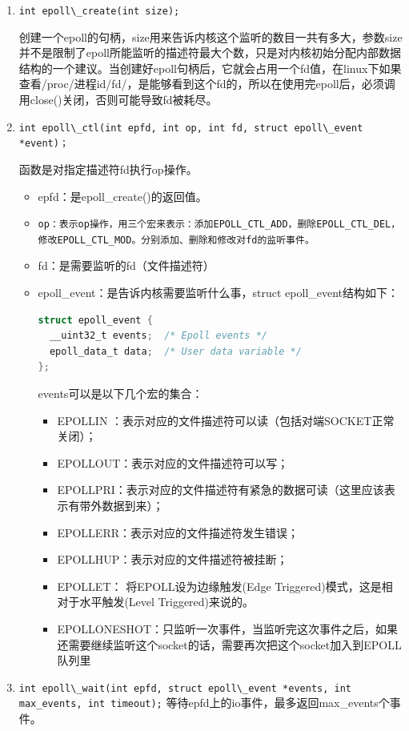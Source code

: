 \documentclass[format=final, language=chinese, degree=fyp]{hustthesis}
\begin{document}
\begin{enumerate}
\item \lstinline {int epoll\_create(int size); }

创建一个epoll的句柄，size用来告诉内核这个监听的数目一共有多大，参数size并不是限制了epoll所能监听的描述符最大个数，只是对内核初始分配内部数据结构的一个建议。当创建好epoll句柄后，它就会占用一个fd值，在linux下如果查看/proc/进程id/fd/，是能够看到这个fd的，所以在使用完epoll后，必须调用close()关闭，否则可能导致fd被耗尽。

\item
\lstinline {int epoll\_ctl(int epfd, int op, int fd, struct epoll\_event *event)；}

函数是对指定描述符fd执行op操作。
	\begin{itemize}
		\item epfd：是epoll\_create()的返回值。\label{item:2}
		\item \verb|op：表示op操作，用三个宏来表示：添加EPOLL_CTL_ADD，删除EPOLL_CTL_DEL，修改EPOLL_CTL_MOD。分别添加、删除和修改对fd的监听事件。|
		\item fd：是需要监听的fd（文件描述符）
		\item epoll\_event：是告诉内核需要监听什么事，struct epoll\_event结构如下：
		\begin{lstlisting}[language=c]
struct epoll_event {
  __uint32_t events;  /* Epoll events */
  epoll_data_t data;  /* User data variable */
};
		\end{lstlisting}
	events可以是以下几个宏的集合：
		\begin{itemize}
			\item EPOLLIN ：表示对应的文件描述符可以读（包括对端SOCKET正常关闭）；\label{item:3}
			\item EPOLLOUT：表示对应的文件描述符可以写；
			\item EPOLLPRI：表示对应的文件描述符有紧急的数据可读（这里应该表示有带外数据到来）；
			\item EPOLLERR：表示对应的文件描述符发生错误；
			\item EPOLLHUP：表示对应的文件描述符被挂断；
			\item EPOLLET： 将EPOLL设为边缘触发(Edge Triggered)模式，这是相对于水平触发(Level Triggered)来说的。
			\item EPOLLONESHOT：只监听一次事件，当监听完这次事件之后，如果还需要继续监听这个socket的话，需要再次把这个socket加入到EPOLL队列里
		\end{itemize}
	\end{itemize}
\item \lstinline {int epoll\_wait(int epfd, struct epoll\_event *events, int max_events, int timeout);}
等待epfd上的io事件，最多返回max\_events个事件。


\end{enumerate}
\end{document}
